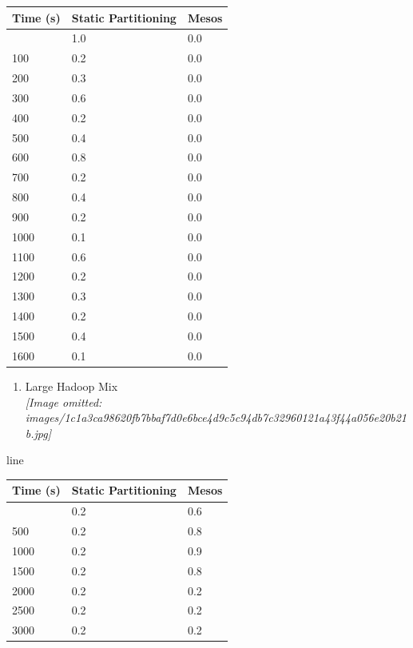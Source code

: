 \documentclass[
]{article}
\newcounter{none} %
\providecommand{\tightlist}{%
  \setlength{\itemsep}{0pt}\setlength{\parskip}{0pt}}
\begin{document}
{\def\LTcaptype{none} %
\begin{longtable}[]{@{}lll@{}}
\toprule\noalign{}
Time (s) & Static Partitioning & Mesos \\
\midrule\noalign{}
\endhead
\bottomrule\noalign{}
\endlastfoot
0 & 1.0 & 0.0 \\
100 & 0.2 & 0.0 \\
200 & 0.3 & 0.0 \\
300 & 0.6 & 0.0 \\
400 & 0.2 & 0.0 \\
500 & 0.4 & 0.0 \\
600 & 0.8 & 0.0 \\
700 & 0.2 & 0.0 \\
800 & 0.4 & 0.0 \\
900 & 0.2 & 0.0 \\
1000 & 0.1 & 0.0 \\
1100 & 0.6 & 0.0 \\
1200 & 0.2 & 0.0 \\
1300 & 0.3 & 0.0 \\
1400 & 0.2 & 0.0 \\
1500 & 0.4 & 0.0 \\
1600 & 0.1 & 0.0 \\
\end{longtable}
}

\begin{enumerate}
\def\labelenumi{(\alph{enumi})}
\setcounter{enumi}{1}
\tightlist
\item
  Large Hadoop Mix\\
  \textit{[Image omitted: images/1c1a3ca98620fb7bbaf7d0e6bce4d9c5c94db7c32960121a43f44a056e20b21b.jpg]}
\end{enumerate}

line

{\def\LTcaptype{none} %
\begin{longtable}[]{@{}lll@{}}
\toprule\noalign{}
Time (s) & Static Partitioning & Mesos \\
\midrule\noalign{}
\endhead
\bottomrule\noalign{}
\endlastfoot
0 & 0.2 & 0.6 \\
500 & 0.2 & 0.8 \\
1000 & 0.2 & 0.9 \\
1500 & 0.2 & 0.8 \\
2000 & 0.2 & 0.2 \\
2500 & 0.2 & 0.2 \\
3000 & 0.2 & 0.2 \\
\end{longtable}
}
\end{document}
